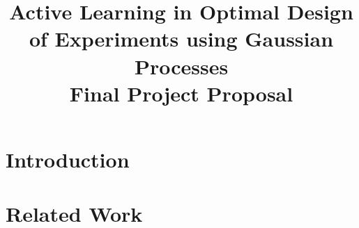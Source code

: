 \documentclass[conference]{IEEEtran}
\begin{document}
\title{\LARGE \textbf{Active Learning in Optimal Design of Experiments using Gaussian Processes} \\ \large Final Project Proposal
}


\author{
} %


\maketitle

\begin{abstract}
\end{abstract}


\section{Introduction}
\label{sec:introduction}








\section{Related Work}
\label{sec:related-work}
\end{document}
